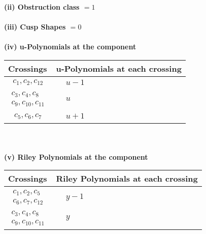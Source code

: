 \documentclass[1p]{elsarticle_modified}
\theoremstyle{definition}
\begin{document}
\flushleft \textbf{(ii) Obstruction class $= 1$}\\~\\
\flushleft \textbf{(iii) Cusp Shapes $= 0$}\\~\\
\newpage\renewcommand{\arraystretch}{1}
\flushleft \textbf{(iv) u-Polynomials at the component}\newline \\
\begin{tabular}{m{50pt}|m{274pt}}
Crossings & \hspace{64pt}u-Polynomials at each crossing \\
\hline $$\begin{aligned}c_{1},c_{2},c_{12}\end{aligned}$$&$\begin{aligned}
&u-1
\end{aligned}$\\
\hline $$\begin{aligned}c_{3},c_{4},c_{8}\\c_{9},c_{10},c_{11}\end{aligned}$$&$\begin{aligned}
&u
\end{aligned}$\\
\hline $$\begin{aligned}c_{5},c_{6},c_{7}\end{aligned}$$&$\begin{aligned}
&u+1
\end{aligned}$\\
\hline
\end{tabular}\\~\\
\newpage\renewcommand{\arraystretch}{1}
\flushleft \textbf{(v) Riley Polynomials at the component}\newline \\
\begin{tabular}{m{50pt}|m{274pt}}
Crossings & \hspace{64pt}Riley Polynomials at each crossing \\
\hline $$\begin{aligned}c_{1},c_{2},c_{5}\\c_{6},c_{7},c_{12}\end{aligned}$$&$\begin{aligned}
&y-1
\end{aligned}$\\
\hline $$\begin{aligned}c_{3},c_{4},c_{8}\\c_{9},c_{10},c_{11}\end{aligned}$$&$\begin{aligned}
&y
\end{aligned}$\\
\hline
\end{tabular}\\~\\
\end{document}
